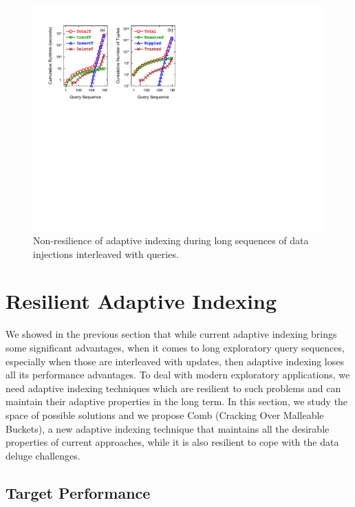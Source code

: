 \begin{figure}[t]
\center
\includegraphics[width=.9\columnwidth]{graphs/figure4.pdf}
\vspace{-1em}
\caption{Non-resilience of adaptive indexing during long sequences of data injections interleaved with queries.}
\vspace{-1em}
\label{F:UpdatesProblem}
\end{figure}
\section{Resilient Adaptive Indexing}
\label{sec:cracke}

We showed in the previous section that while current adaptive indexing brings some significant advantages,
when it comes to long exploratory query sequences, especially when those are interleaved with updates,
then adaptive indexing loses all its performance advantages.
To deal with modern exploratory applications, we need adaptive indexing techniques which are resilient
to such problems and can maintain their adaptive properties in the long term.
In this section, we study the space of possible solutions and we propose Comb (Cracking Over Malleable Buckets), a new 
adaptive indexing technique that maintains all the desirable properties of current approaches,
while it is also resilient to cope with the data deluge challenges. 


\subsection{Target Performance}


